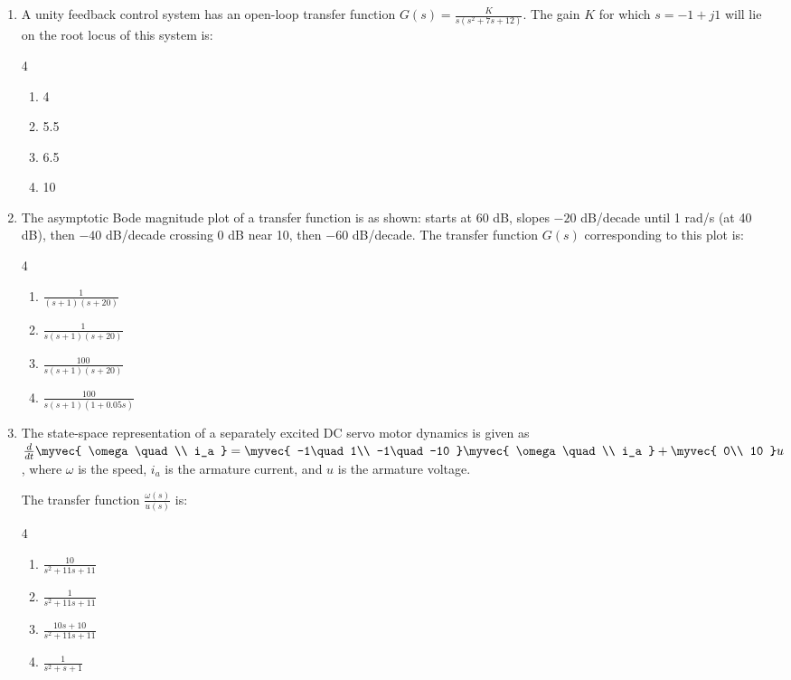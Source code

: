 \begin{enumerate}[label=\thesubsection.\arabic*,ref=\thesubsection.\theenumi]
\item A unity feedback control system has an open-loop transfer function
$
G(s)=\frac{K}{s(s^2+7s+12)}.
$
The gain $K$ for which $s=-1+j1$ will lie on the root locus of this system is:
\hfill{}
\begin{multicols}{4}
\begin{enumerate}
    \item 4
    \item 5.5
    \item 6.5
    \item 10
\end{enumerate}
\end{multicols}

\item The asymptotic Bode magnitude plot of a transfer function is as shown: starts at 60 dB, slopes $-20$ dB/decade until 1 rad/s (at 40 dB), then $-40$ dB/decade crossing 0 dB near 10, then $-60$ dB/decade. The transfer function $G(s)$ corresponding to this plot is: 
\hfill{}
\begin{multicols}{4}
\begin{enumerate}
    \item $\frac{1}{(s+1)(s+20)}$
    \item $\frac{1}{s(s+1)(s+20)}$
    \item $\frac{100}{s(s+1)(s+20)}$
    \item $\frac{100}{s(s+1)(1+0.05s)}$
\end{enumerate}
\end{multicols}

 \item
    The state-space representation of a separately excited DC servo motor dynamics is given as
    $
    \frac{d}{dt}
    \myvec{
        \omega\quad\\
        i_a
    }
    =
    \myvec{
        -1\quad 1\\
        -1\quad -10
    }
    \myvec{
        \omega\quad\\
        i_a
    }
    +
    \myvec{
        0\\
        10
    }
    u
    $,
    where $\omega$ is the speed, $i_a$ is the armature current, and $u$ is the armature voltage. \quad

    The transfer function $\frac{\omega(s)}{u(s)}$ is: 
\hfill{}
\begin{multicols}{4}
\begin{enumerate}
    \item $\frac{10}{s^2+11s+11}$
    \item $\frac{1}{s^2+11s+11}$
    \item $\frac{10s+10}{s^2+11s+11}$
    \item $\frac{1}{s^2+s+1}$
\end{enumerate}
\end{multicols}



\end{enumerate}
